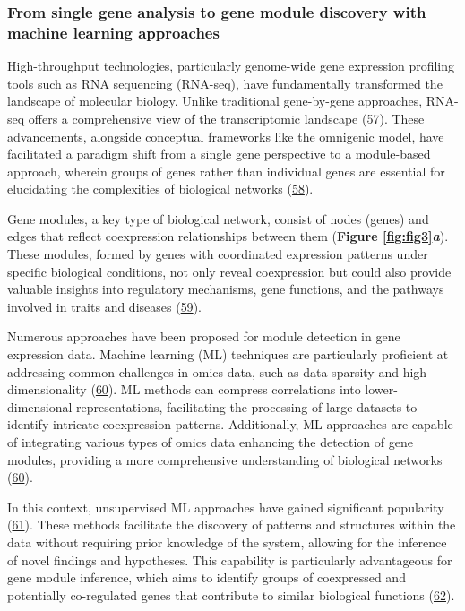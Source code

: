 \hypertarget{from-single-gene-analysis-to-gene-module-discovery-with-machine-learning-approaches}{%
\subsubsection{From single gene analysis to gene module discovery with machine learning approaches}\label{from-single-gene-analysis-to-gene-module-discovery-with-machine-learning-approaches}}

High-throughput technologies, particularly genome-wide gene expression profiling tools such as RNA sequencing (RNA-seq), have fundamentally transformed the landscape of molecular biology.
Unlike traditional gene-by-gene approaches, RNA-seq offers a comprehensive view of the transcriptomic landscape (\protect\hyperlink{ref-Zm8nV5AC}{57}).
These advancements, alongside conceptual frameworks like the omnigenic model, have facilitated a paradigm shift from a single gene perspective to a module-based approach, wherein groups of genes rather than individual genes are essential for elucidating the complexities of biological networks (\protect\hyperlink{ref-SD886fuE}{58}).

Gene modules, a key type of biological network, consist of nodes (genes) and edges that reflect coexpression relationships between them (\textbf{Figure \ref{fig:fig3}\emph{a}}).
These modules, formed by genes with coordinated expression patterns under specific biological conditions, not only reveal coexpression but could also provide valuable insights into regulatory mechanisms, gene functions, and the pathways involved in traits and diseases (\protect\hyperlink{ref-QUI8V4RY}{59}).

Numerous approaches have been proposed for module detection in gene expression data.
Machine learning (ML) techniques are particularly proficient at addressing common challenges in omics data, such as data sparsity and high dimensionality (\protect\hyperlink{ref-K4KeL4gw}{60}).
ML methods can compress correlations into lower-dimensional representations, facilitating the processing of large datasets to identify intricate coexpression patterns.
Additionally, ML approaches are capable of integrating various types of omics data enhancing the detection of gene modules, providing a more comprehensive understanding of biological networks (\protect\hyperlink{ref-K4KeL4gw}{60}).

In this context, unsupervised ML approaches have gained significant popularity (\protect\hyperlink{ref-Ko8gMp8P}{61}).
These methods facilitate the discovery of patterns and structures within the data without requiring prior knowledge of the system, allowing for the inference of novel findings and hypotheses.
This capability is particularly advantageous for gene module inference, which aims to identify groups of coexpressed and potentially co-regulated genes that contribute to similar biological functions (\protect\hyperlink{ref-1BVbSrr6M}{62}).

